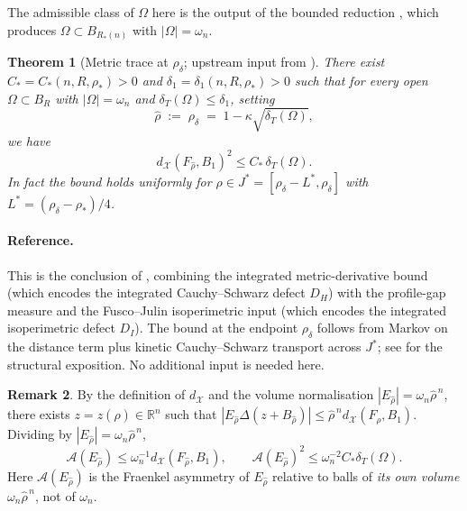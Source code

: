 \documentclass[11pt]{article}
\newtheorem{theorem}{Theorem}[section]
\theoremstyle{definition}
\newtheorem{remark}[theorem]{Remark}
\newcommand{\R}{\mathbb{R}}
\newcommand{\Fr}{\mathcal{A}}
\newcommand{\Om}{\Omega}
\newcommand{\rstar}{\rho_{*}}
\newcommand{\rhad}{\widehat\rho}
\newcommand{\X}{\mathcal X}
\begin{document}
The admissible class of $\Om$ here is the output of the bounded
reduction \cite{BDV-BoundedReduction-Plan1}, which produces
$\Om\subset B_{R_*(n)}$ with $|\Om|=\omega_n$.

\begin{theorem}[Metric trace at $\rho_\delta$; upstream input from \cite{WeightedMetricTrace}]
\label{thm:metric-trace}
There exist $C_*=C_*(n,R,\rstar)>0$ and
$\delta_1=\delta_1(n,R,\rstar)>0$ such that for every open
$\Om\subset B_R$ with $|\Om|=\omega_n$ and
$\delta_T(\Om)\le\delta_1$, setting
\begin{equation}\label{eq:rhad-window}
\rhad\;:=\;\rho_\delta\;=\;1-\kappa\sqrt{\delta_T(\Om)},
\end{equation}
we have
\begin{equation}\label{eq:metric-trace}
d_{\X}(F_{\rhad},B_1)^{2}\le C_*\,\delta_T(\Om).
\end{equation}
In fact the bound holds uniformly for $\rho\in J^*=[\rho_\delta-L^*,\rho_\delta]$
with $L^*=(\rho_\delta-\rstar)/4$.
\end{theorem}

\paragraph{Reference.}
This is the conclusion of \cite[Thm.~5.6, Cor.~5.7]{WeightedMetricTrace},
combining the integrated metric-derivative bound
\cite[(4.2)]{WeightedMetricTrace} (which encodes the integrated
Cauchy--Schwarz defect $D_H$) with the profile-gap measure
\cite[(5.1)]{LevelSetIdentity} and the Fusco--Julin
isoperimetric input \cite[Lemma~3.1]{WeightedMetricTrace}
(which encodes the integrated isoperimetric defect $D_I$).  The bound
at the endpoint $\rho_\delta$ follows from Markov on the distance term
plus kinetic Cauchy--Schwarz transport across $J^*$; see
\cite[Rem.~5.7]{WeightedMetricTrace} for the structural exposition.
No additional input is needed here.

\begin{remark}\label{rem:asym-as-distance}
By the definition of $d_{\X}$ and the volume normalisation
$|E_{\rhad}|=\omega_n\rhad^{\,n}$, there exists
$z=z(\rhad)\in\R^n$ such that
$|E_{\rhad}\Delta(z+B_{\rhad})|\le \rhad^{\,n}d_{\X}(F_{\rhad},B_1)$.
Dividing by $|E_{\rhad}|=\omega_n\rhad^{\,n}$,
\begin{equation}\label{eq:Aerho}
\Fr(E_{\rhad})\le \omega_n^{-1}d_{\X}(F_{\rhad},B_1),
\qquad
\Fr(E_{\rhad})^{2}\le \omega_n^{-2}C_*\delta_T(\Om).
\end{equation}
Here $\Fr(E_{\rhad})$ is the Fraenkel asymmetry of $E_{\rhad}$
relative to balls of \emph{its own volume} $\omega_n\rhad^{\,n}$,
not of $\omega_n$.
\end{remark}
\end{document}

